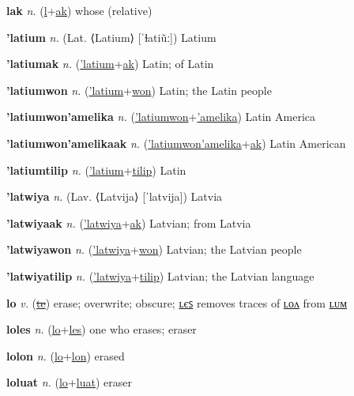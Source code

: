 \textbf{\hypertarget{lak}{lak}} \textit{n.} (\hyperlink{l}{l}+\allowbreak \hyperlink{ak}{ak})
whose (relative)

\textbf{\hypertarget{'latium}{'latium}} \textit{n.} (Lat. ⟨Latium⟩ [ˈɫatiũː])
Latium

\textbf{\hypertarget{'latiumak}{'latiumak}} \textit{n.} (\hyperlink{'latium}{'latium}+\allowbreak \hyperlink{ak}{ak})
Latin; of Latin

\textbf{\hypertarget{'latiumwon}{'latiumwon}} \textit{n.} (\hyperlink{'latium}{'latium}+\allowbreak \hyperlink{won}{won})
Latin; the Latin people

\textbf{\hypertarget{'latiumwon'amelika}{'latiumwon'amelika}} \textit{n.} (\hyperlink{'latiumwon}{'latiumwon}+\allowbreak \hyperlink{'amelika}{'amelika})
Latin America

\textbf{\hypertarget{'latiumwon'amelikaak}{'latiumwon'amelikaak}} \textit{n.} (\hyperlink{'latiumwon'amelika}{'latiumwon'amelika}+\allowbreak \hyperlink{ak}{ak})
Latin American

\textbf{\hypertarget{'latiumtilip}{'latiumtilip}} \textit{n.} (\hyperlink{'latium}{'latium}+\allowbreak \hyperlink{tilip}{tilip})
Latin

\textbf{\hypertarget{'latwiya}{'latwiya}} \textit{n.} (Lav. ⟨Latvija⟩ [ˈlatvija])
Latvia

\textbf{\hypertarget{'latwiyaak}{'latwiyaak}} \textit{n.} (\hyperlink{'latwiya}{'latwiya}+\allowbreak \hyperlink{ak}{ak})
Latvian; from Latvia

\textbf{\hypertarget{'latwiyawon}{'latwiyawon}} \textit{n.} (\hyperlink{'latwiya}{'latwiya}+\allowbreak \hyperlink{won}{won})
Latvian; the Latvian people

\textbf{\hypertarget{'latwiyatilip}{'latwiyatilip}} \textit{n.} (\hyperlink{'latwiya}{'latwiya}+\allowbreak \hyperlink{tilip}{tilip})
Latvian; the Latvian language

\textbf{\hypertarget{lo}{lo}} \textit{v.} (\hyperlink{te}{\sout{te}})
erase; overwrite; obscure; \hyperlink{loles}{ʟєꜱ} removes traces of \hyperlink{lolon}{ʟᴏᴧ} from \hyperlink{lolum}{ʟᴜᴍ}

\textbf{\hypertarget{loles}{loles}} \textit{n.} (\hyperlink{lo}{lo}+\allowbreak \hyperlink{les}{les})
one who erases; eraser

\textbf{\hypertarget{lolon}{lolon}} \textit{n.} (\hyperlink{lo}{lo}+\allowbreak \hyperlink{lon}{lon})
erased

\textbf{\hypertarget{loluat}{loluat}} \textit{n.} (\hyperlink{lo}{lo}+\allowbreak \hyperlink{luat}{luat})
eraser

